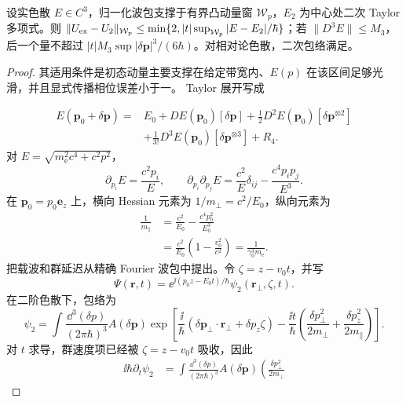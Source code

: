 \begin{proposition}[实谱乘法传播子的二次截断界]
设实色散 $E\in C^3$，归一化波包支撑于有界凸动量窗 $\mathcal W_p$，$E_2$ 为中心处二次 Taylor 多项式。则 $\|U_{\rm ex}-U_2\|_{\mathcal W_p}\le\min\{2,|t|\sup_{\mathcal W_p}|E-E_2|/\hbar\}$；若 $\|D^3E\|\le M_3$，后一个量不超过 $|t|M_3\sup|\delta\mathbf p|^3/(6\hbar)$。对相对论色散，二次包络满足。
\end{proposition}
\begin{proof}
其适用条件是初态动量主要支撑在给定带宽内、$E(p)$ 在该区间足够光滑，并且显式传播相位误差小于一。 Taylor 展开写成

\begin{align*}
E(\mathbf p_0+\delta\mathbf p)
={}&E_0+DE(\mathbf p_0)[\delta\mathbf p]
+\frac12D^2E(\mathbf p_0)[\delta\mathbf p^{\otimes2}]\\
&+\frac1{3!}D^3E(\mathbf p_0)[\delta\mathbf p^{\otimes3}]+R_4.
\end{align*}
对 $E=\sqrt{m_{\mathrm e}^2c^4+c^2p^2}$，
\begin{equation*}
\partial_{p_i}E=\frac{c^2p_i}{E},
\qquad
\partial_{p_i}\partial_{p_j}E
=\frac{c^2}{E}\delta_{ij}-\frac{c^4p_ip_j}{E^3}.
\end{equation*}
在 $\mathbf p_0=p_0\mathbf e_z$ 上，横向 Hessian 元素为 $1/m_\perp=c^2/E_0$，纵向元素为
\begin{align*}
\frac1{m_\parallel}
&=\frac{c^2}{E_0}-\frac{c^4p_0^2}{E_0^3}\\
&=\frac{c^2}{E_0}\left(1-\frac{v_0^2}{c^2}\right)
=\frac{1}{\gamma_0^3m_{\mathrm e}}.
\end{align*}
把载波和群延迟从精确 Fourier 波包中提出。令 $\zeta=z-v_0t$，并写
\begin{equation*}
\Psi(\mathbf r,t)
=\ee^{\ii(p_0z-E_0t)/\hbar}
\psi_2(\mathbf r_\perp,\zeta,t).
\end{equation*}
在二阶色散下，包络为
\begin{equation*}
\psi_2
=\int\frac{\dd^3(\delta p)}{(2\pi\hbar)^3}
A(\delta\mathbf p)
\exp\!\left[
\frac{\ii}{\hbar}(\delta\mathbf p_\perp\cdot\mathbf r_\perp+\delta p_z\zeta)
-\frac{\ii t}{\hbar}
\left(\frac{\delta p_\perp^2}{2m_\perp}
+\frac{\delta p_z^2}{2m_\parallel}\right)\right].
\end{equation*}
对 $t$ 求导，群速度项已经被 $\zeta=z-v_0t$ 吸收，因此
\begin{align*}
\ii\hbar\partial_t\psi_2
&=\int\frac{\dd^3(\delta p)}{(2\pi\hbar)^3}
A(\delta\mathbf p)
\left(\frac{\delta p_\perp^2}{2m_\perp}

\end{align*}
\end{proof}
